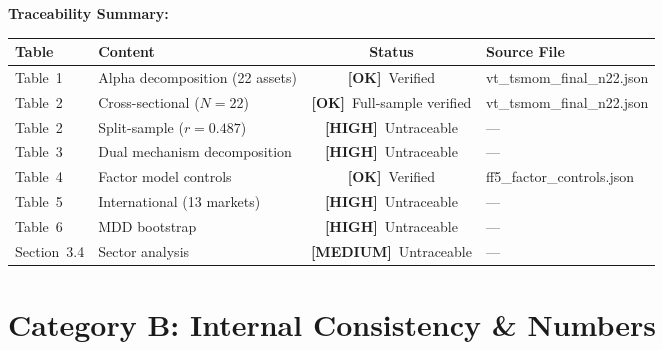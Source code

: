 \documentclass[12pt,a4paper]{article}
\newcommand{\HIGH}{\textcolor{highsev}{\textbf{[HIGH]}}}
\newcommand{\MEDIUM}{\textcolor{medsev}{\textbf{[MEDIUM]}}}
\newcommand{\OK}{\textcolor{okgreen}{\textbf{[OK]}}}
\begin{document}
\medskip
\noindent\textbf{Traceability Summary:}

\begin{center}
\small
\begin{tabular}{llcl}
\toprule
Table & Content & Status & Source File \\
\midrule
Table~1 & Alpha decomposition (22 assets) & \OK\ Verified & vt\_tsmom\_final\_n22.json \\
Table~2 & Cross-sectional ($N = 22$) & \OK\ Full-sample verified & vt\_tsmom\_final\_n22.json \\
Table~2 & Split-sample ($r = 0.487$) & \HIGH\ Untraceable & --- \\
Table~3 & Dual mechanism decomposition & \HIGH\ Untraceable & --- \\
Table~4 & Factor model controls & \OK\ Verified & ff5\_factor\_controls.json \\
Table~5 & International (13 markets) & \HIGH\ Untraceable & --- \\
Table~6 & MDD bootstrap & \HIGH\ Untraceable & --- \\
Section~3.4 & Sector analysis & \MEDIUM\ Untraceable & --- \\
\bottomrule
\end{tabular}
\end{center}


\section{Category B: Internal Consistency \& Numbers}
\label{sec:consistency}
\end{document}
